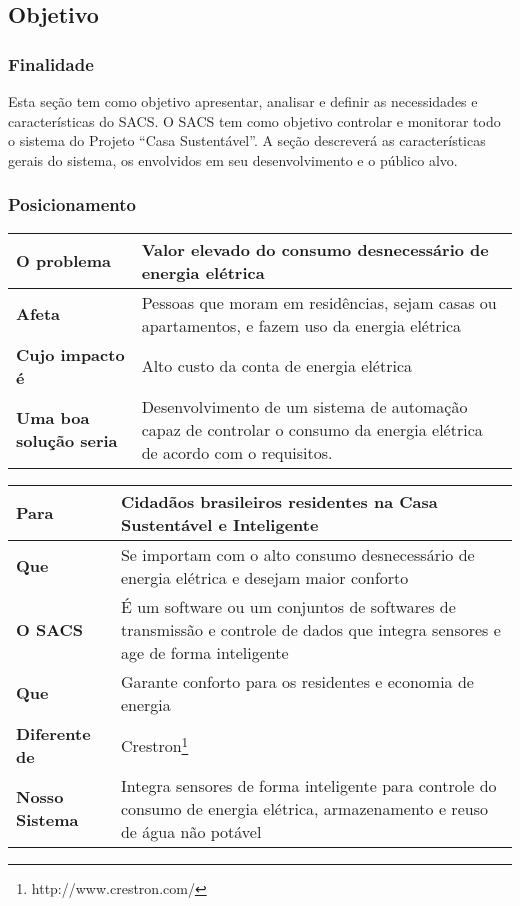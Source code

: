 \subsection{Objetivo}
\label{subsec:objetivo}

\subsubsection{Finalidade}

	Esta seção tem como objetivo apresentar, analisar e definir as necessidades e características do SACS. O
	SACS tem como objetivo controlar e monitorar todo o sistema do Projeto “Casa Sustentável”. A seção
	descreverá as características gerais do sistema, os envolvidos em seu desenvolvimento e o público alvo.

\subsubsection{Posicionamento}


\begin{longtable}{|l|m{7cm}|}
	\hline \textbf{O problema} & Valor elevado do consumo desnecessário de energia elétrica\\
	\hline \textbf{Afeta} & Pessoas que moram em residências, sejam casas ou apartamentos, e fazem uso da energia
	elétrica\\
	\hline \textbf{Cujo impacto é} & Alto custo da conta de energia elétrica\\
	\hline \textbf{Uma boa solução seria} & Desenvolvimento de um sistema de automação capaz de controlar o consumo
	da energia elétrica de acordo com o requisitos.\\
	\hline
\end{longtable}


\begin{longtable}{|l|m{7cm}|}
	\hline \textbf{Para} & Cidadãos brasileiros residentes na Casa Sustentável e Inteligente \\
	\hline \textbf{Que} & Se importam com o alto consumo desnecessário de energia elétrica e desejam maior conforto\\
	\hline \textbf{O SACS} & É um software ou um conjuntos de softwares de transmissão e controle de dados que
	integra sensores e age de forma inteligente\\
	\hline \textbf{Que} & Garante conforto para os residentes e economia de energia\\
	\hline \textbf{Diferente de} & Crestron\footnote{http://www.crestron.com/}\\
	\hline \textbf{Nosso Sistema} & Integra sensores de forma inteligente para controle do consumo de energia elétrica,
	armazenamento e reuso de água não potável\\
	\hline
\end{longtable}

